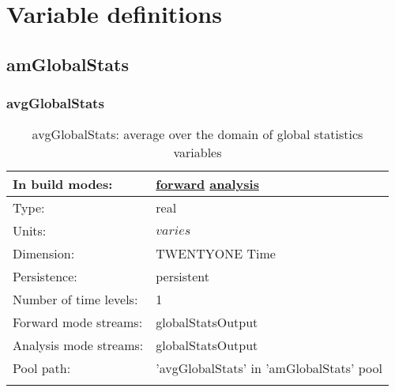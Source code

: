 \chapter[Variable definitions]{Variable definitions}
\label{chap:variable_sections}
\section[amGlobalStats]{amGlobalStats}
\label{sec:var_sec_amGlobalStats}
\subsection[avgGlobalStats]{avgGlobalStats}
\label{subsec:var_sec_amGlobalStats_avgGlobalStats}
\begin{center}
\begin{longtable}{| p{2.0in} | p{4.0in} |}
        \hline 
        In build modes: & \hyperref[subsec:forward_var_tab_amGlobalStats]{forward} \hyperref[subsec:analysis_var_tab_amGlobalStats]{analysis} \\
        \hline 
        Type: & real \\
        \hline 
        Units: & $varies$ \\
        \hline 
        Dimension: & TWENTYONE Time \\
        \hline 
        Persistence: & persistent \\
        \hline 
        Number of time levels: & 1 \\
        \hline 
		 Forward mode streams: &  globalStatsOutput \\
        \hline 
		 Analysis mode streams: &  globalStatsOutput \\
        \hline 
            Pool path: & 'avgGlobalStats' in 'amGlobalStats' pool
 \\
		 \hline 
    \caption{avgGlobalStats: average over the domain of global statistics variables}
\end{longtable}
\end{center}
